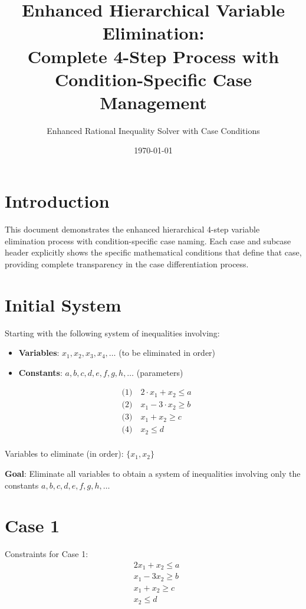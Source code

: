 \documentclass{article}
\title{Enhanced Hierarchical Variable Elimination: \\
Complete 4-Step Process with Condition-Specific Case Management}
\author{Enhanced Rational Inequality Solver with Case Conditions}
\date{\today}
\begin{document}
\maketitle

\section{Introduction}

This document demonstrates the enhanced hierarchical 4-step variable elimination process
with condition-specific case naming. Each case and subcase header explicitly shows the
specific mathematical conditions that define that case, providing complete transparency
in the case differentiation process.

\section{Initial System}

Starting with the following system of inequalities involving:
\begin{itemize}
\item \textbf{Variables}: $x_1, x_2, x_3, x_4, \ldots$ (to be eliminated in order)
\item \textbf{Constants}: $a, b, c, d, e, f, g, h, \ldots$ (parameters)
\end{itemize}

\begin{align}
& \text{(1)} \quad 2 \cdot x_{1} + x_{2} \leq a \\
& \text{(2)} \quad x_{1} - 3 \cdot x_{2} \geq b \\
& \text{(3)} \quad x_{1} + x_{2} \geq c \\
& \text{(4)} \quad x_{2} \leq d \\
\end{align}

Variables to eliminate (in order): $\{x_{1}, x_{2}\}$

\textbf{Goal}: Eliminate all variables to obtain a system of inequalities
involving only the constants $a, b, c, d, e, f, g, h, \ldots$

\section{Case 1}

Constraints for Case 1:
\begin{align}
& 2 x_{1} + x_{2} \leq a \\
& x_{1} - 3 x_{2} \geq b \\
& x_{1} + x_{2} \geq c \\
& x_{2} \leq d \\
\end{align}
\end{document}
